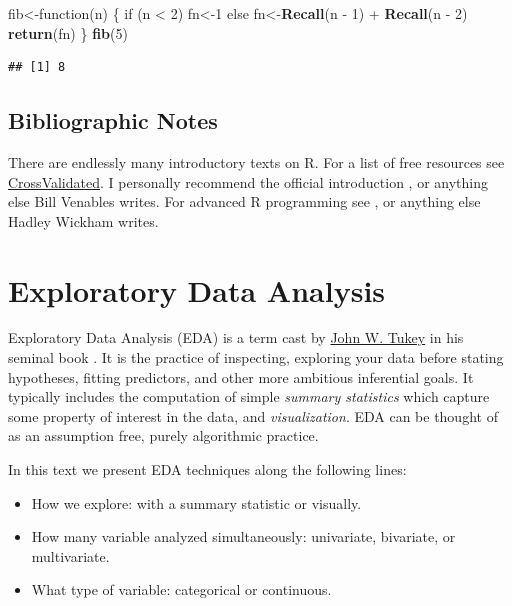 \documentclass[]{book}
\newenvironment{Shaded}{\begin{snugshade}}{\end{snugshade}}
\newcommand{\KeywordTok}[1]{\textcolor[rgb]{0.13,0.29,0.53}{\textbf{{#1}}}}
\newcommand{\DecValTok}[1]{\textcolor[rgb]{0.00,0.00,0.81}{{#1}}}
\newcommand{\StringTok}[1]{\textcolor[rgb]{0.31,0.60,0.02}{{#1}}}
\newcommand{\NormalTok}[1]{{#1}}
\providecommand{\tightlist}{%
  \setlength{\itemsep}{0pt}\setlength{\parskip}{0pt}}
\theoremstyle{definition}
\theoremstyle{definition}
\theoremstyle{remark}
\begin{document}
\begin{Shaded}
\begin{Highlighting}[]
\NormalTok{fib<-function(n) \{}
    \NormalTok{if (n <}\StringTok{ }\DecValTok{2}\NormalTok{) fn<-}\DecValTok{1} 
    \NormalTok{else fn<-}\KeywordTok{Recall}\NormalTok{(n -}\StringTok{ }\DecValTok{1}\NormalTok{) +}\StringTok{ }\KeywordTok{Recall}\NormalTok{(n -}\StringTok{ }\DecValTok{2}\NormalTok{) }
    \KeywordTok{return}\NormalTok{(fn)}
\NormalTok{\} }
\KeywordTok{fib}\NormalTok{(}\DecValTok{5}\NormalTok{)}
\end{Highlighting}
\end{Shaded}

\begin{verbatim}
## [1] 8
\end{verbatim}

\section{Bibliographic Notes}\label{bibliographic-notes-1}

There are endlessly many introductory texts on R. For a list of free
resources see
\href{http://stats.stackexchange.com/questions/138/free-resources-for-learning-r}{CrossValidated}.
I personally recommend the official introduction
\citet{venables2004introduction}, or anything else Bill Venables writes.
For advanced R programming see \citet{wickham2014advanced}, or anything
else Hadley Wickham writes.

\chapter{Exploratory Data Analysis}\label{eda}

Exploratory Data Analysis (EDA) is a term cast by
\href{https://en.wikipedia.org/wiki/John_Tukey}{John W. Tukey} in his
seminal book \citet{tukey1977exploratory}. It is the practice of
inspecting, exploring your data before stating hypotheses, fitting
predictors, and other more ambitious inferential goals. It typically
includes the computation of simple \emph{summary statistics} which
capture some property of interest in the data, and \emph{visualization}.
EDA can be thought of as an assumption free, purely algorithmic
practice.

In this text we present EDA techniques along the following lines:

\begin{itemize}
\tightlist
\item
  How we explore: with a summary statistic or visually.
\item
  How many variable analyzed simultaneously: univariate, bivariate, or
  multivariate.
\item
  What type of variable: categorical or continuous.
\end{itemize}
\end{document}
